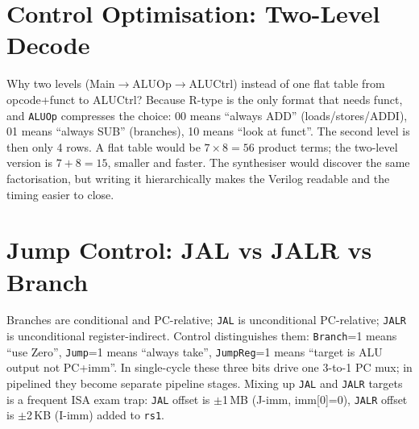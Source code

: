 \section{Control Optimisation: Two-Level Decode}
Why two levels (Main$\to$ALUOp$\to$ALUCtrl) instead of one flat table from opcode+funct to ALUCtrl? Because R-type is the only format that needs funct, and \texttt{ALUOp} compresses the choice: 00 means ``always ADD'' (loads/stores/ADDI), 01 means ``always SUB'' (branches), 10 means ``look at funct''. The second level is then only 4 rows. A flat table would be $7\times8=56$ product terms; the two-level version is $7+8=15$, smaller and faster. The synthesiser would discover the same factorisation, but writing it hierarchically makes the Verilog readable and the timing easier to close.

\section{Jump Control: JAL vs JALR vs Branch}
Branches are conditional and PC-relative; \texttt{JAL} is unconditional PC-relative; \texttt{JALR} is unconditional register-indirect. Control distinguishes them: \texttt{Branch}=1 means ``use Zero'', \texttt{Jump}=1 means ``always take'', \texttt{JumpReg}=1 means ``target is ALU output not PC+imm''. In single-cycle these three bits drive one 3-to-1 PC mux; in pipelined they become separate pipeline stages. Mixing up \texttt{JAL} and \texttt{JALR} targets is a frequent ISA exam trap: \texttt{JAL} offset is $\pm$1\,MB (J-imm, imm[0]=0), \texttt{JALR} offset is $\pm$2\,KB (I-imm) added to \texttt{rs1}.

\begin{center}
\end{center}

